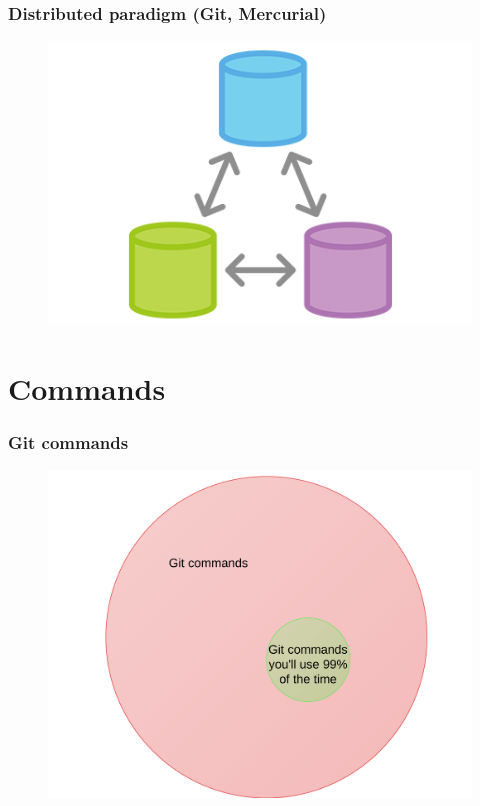\documentclass{beamer}
\begin{document}
\begin{frame}
    \frametitle{Distributed paradigm (Git, Mercurial)}
    \begin{figure}[h!]
        \begin{center}
            \includegraphics[scale=0.55]{distributed.png}
        \end{center}
    \end{figure}
\end{frame}

\section{Commands}

\begin{frame}
    \frametitle{Git commands}
    \begin{figure}[h!]
        \begin{center}
            \includegraphics[scale=0.09]{git_commands1.png}
        \end{center} \end{figure}
\end{frame}
\end{document}
